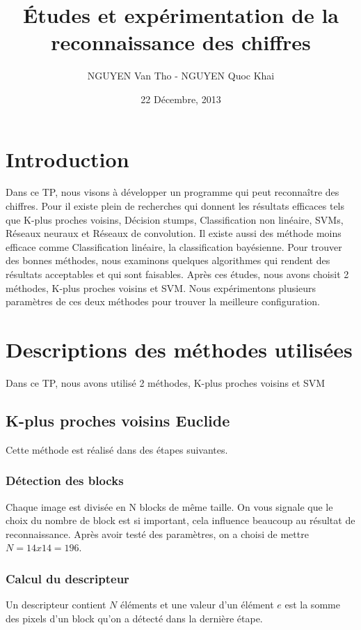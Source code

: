 \documentclass[]{article}   %
\begin{document}
\title{Études et expérimentation de la reconnaissance des chiffres}   %
\author{NGUYEN Van Tho - NGUYEN Quoc Khai}         %
\date{22 Décembre, 2013}    %
\maketitle

\section{Introduction}
Dans ce TP, nous visons à développer un programme qui peut reconnaître des chiffres. Pour 
il existe plein de recherches qui donnent les résultats efficaces 
tels que K-plus proches voisins, Décision stumps, Classification non linéaire, SVMs, 
Réseaux neuraux et Réseaux de convolution\cite{c1}. Il existe aussi des méthode moins 
efficace comme Classification linéaire, la classification bayésienne. Pour 
trouver des bonnes méthodes, nous examinons quelques algorithmes qui rendent des 
résultats acceptables et qui sont faisables. Après ces études, nous avons choisit 2 
méthodes, K-plus proches voisins et SVM. Nous expérimentons plusieurs paramètres de ces 
deux méthodes pour trouver la meilleure configuration.\\

\section{Descriptions des méthodes utilisées}
Dans ce TP, nous avons utilisé 2 méthodes, K-plus proches voisins et SVM
\subsection{K-plus proches voisins Euclide}
Cette méthode est réalisé dans des étapes suivantes.
\subsubsection{Détection des blocks}
Chaque image est divisée en N blocks de même taille. On vous signale que le choix du nombre de block est si important, cela influence beaucoup au résultat de reconnaissance. Après avoir testé des paramètres, on a choisi de mettre $N = 14x14 = 196$.
\subsubsection{Calcul du descripteur}
Un descripteur contient $N$ éléments et une valeur d'un élément $e$ est la somme des pixels d'un block qu'on a détecté dans la dernière étape.
\end{document}
